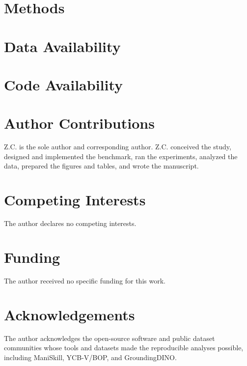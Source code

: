 \documentclass[10pt]{article}
\begin{document}
\section{Methods}


\section{Data Availability}


\section{Code Availability}


\section{Author Contributions}
Z.C. is the sole author and corresponding author. Z.C. conceived the study, designed and implemented the benchmark, ran the experiments, analyzed the data, prepared the figures and tables, and wrote the manuscript.

\section{Competing Interests}
The author declares no competing interests.

\section{Funding}
The author received no specific funding for this work.

\section{Acknowledgements}
The author acknowledges the open-source software and public dataset communities whose tools and datasets made the reproducible analyses possible, including ManiSkill, YCB-V/BOP, and GroundingDINO.



\end{document}
